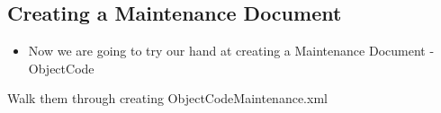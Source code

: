 \begin{ifhtml}
\begin{s5slide}
        \section{Creating a Maintenance Document}
            \begin{itemize}
                \item Now we are going to try our hand at creating a Maintenance Document - ObjectCode
            \end{itemize}
            \begin{s5notes}
                Walk them through creating ObjectCodeMaintenance.xml
            \end{s5notes}
    \end{s5slide}
\end{ifhtml}